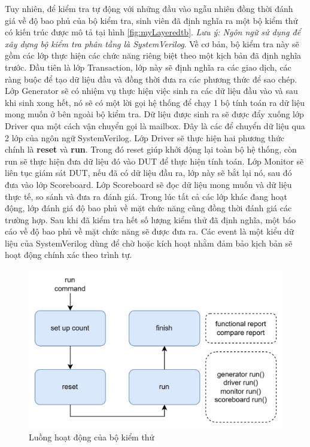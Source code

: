 Tuy nhiên, để kiểm tra tự động với những đầu vào ngẫu nhiên đồng thời đánh giá về độ bao phủ của bộ kiểm tra, sinh viên đã định nghĩa ra một bộ kiểm thử có kiến trúc được mô tả tại hình \ref{fig:myLayeredtb}. \textit{Lưu ý: Ngôn ngữ sử dụng để xây dựng bộ kiểm tra phân tầng là SystemVerilog}. Về cơ bản, bộ kiểm tra này sẽ gồm các lớp thực hiện các chức năng riêng biệt theo một kịch bản đã định nghĩa trước. Đầu tiên là lớp Transaction, lớp này sẽ định nghĩa ra các giao dịch, các ràng buộc để tạo dữ liệu đầu và đồng thời đưa ra các phương thức để sao chép. Lớp Generator sẽ có nhiệm vụ thực hiện việc sinh ra các dữ liệu đầu vào và sau khi sinh xong hết, nó sẽ có một lời gọi hệ thống để chạy 1 bộ tính toán ra dữ liệu mong muốn ở bên ngoài bộ kiểm tra. Dữ liệu được sinh ra sẽ được đẩy xuống lớp Driver qua một cách vận chuyển gọi là mailbox. Đây là các để chuyển dữ liệu qua 2 lớp của ngôn ngữ SystemVerilog. Lớp Driver sẽ thực hiện hai phương thức chính là \textbf{reset} và \textbf{run}. Trong đó reset giúp khởi động lại toàn bộ hệ thống, còn run sẽ thực hiện đưa dữ liệu đó vào DUT để thực hiện tính toán. Lớp Monitor sẽ liên tục giám sát DUT, nếu đã có dữ liệu đầu ra, lớp này sẽ bắt lại nó, sau đó đưa vào lớp Scoreboard. Lớp Scoreboard sẽ đọc dữ liệu mong muốn và dữ liệu thực tế, so sánh và đưa ra đánh giá. Trong lúc tất cả các lớp khác đang hoạt động, lớp đánh giá độ bao phủ về mặt chức năng cũng đồng thời đánh giá các trường hợp. Sau khi đã kiểm tra hết số lượng kiểm thử đã định nghĩa, một báo cáo về độ bao phủ về mặt chức năng sẽ được đưa ra. Các event là một kiểu dữ liệu của SystemVerilog dùng để chờ hoặc kích hoạt nhằm đảm bảo kịch bản sẽ hoạt động chính xác theo trình tự. 
\begin{figure}[!hb]
	\centering
	\includegraphics[width=1\linewidth]{figures/soc2.png}
	\caption{Luồng hoạt động của bộ kiểm thử}
	\label{fig:soc2}
\end{figure}

